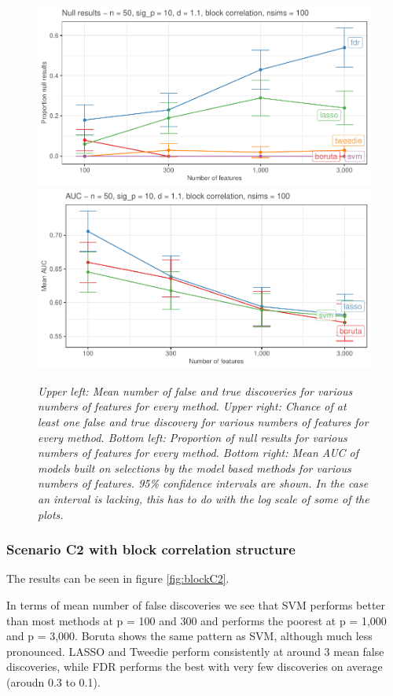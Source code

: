 \documentclass[
]{article}
\begin{document}
\begin{figure}

{\centering \includegraphics[width=0.49\linewidth]{main_files/figure-latex/blockA1-1} \includegraphics[width=0.49\linewidth]{main_files/figure-latex/blockA1-2} 

}

\caption{\textit{Upper left: Mean number of false and true discoveries for various numbers of features for every method. Upper right: Chance of at least one false and true discovery for various numbers of features for every method. Bottom left: Proportion of null results for various numbers of features for every method. Bottom right: Mean AUC of models built on selections by the model based methods for various numbers of features. 95\% confidence intervals are shown. In the case an interval is lacking, this has to do with the log scale of some of the plots.}}\label{fig:blockA1}
\end{figure}

\hypertarget{scenario-c2-with-block-correlation-structure}{%
\subsubsection{Scenario C2 with block correlation structure}\label{scenario-c2-with-block-correlation-structure}}

The results can be seen in figure \ref{fig:blockC2}.

In terms of mean number of false discoveries we see that SVM performs better than most methods at p = 100 and 300 and performs the poorest at p = 1,000 and p = 3,000. Boruta shows the same pattern as SVM, although much less pronounced. LASSO and Tweedie perform consistently at around 3 mean false discoveries, while FDR performs the best with very few discoveries on average (aroudn 0.3 to 0.1).
\end{document}
